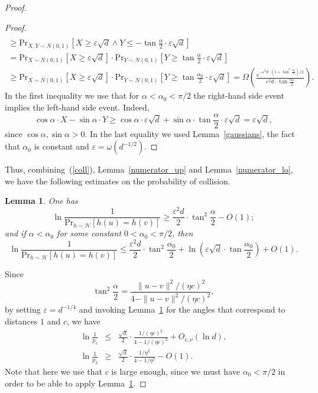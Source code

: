 \documentclass[11pt,letterpaper]{article}
\newtheorem{lemma}[theorem]{Lemma}
\newcommand{\eps}{\varepsilon}
\begin{document}
\begin{proof}
\begin{proof}
\begin{multline*}
            \\ \geq \mathrm{Pr}_{X, Y \sim N(0, 1)}[X \geq \eps \sqrt{d} \wedge Y \leq - \tan \frac{\alpha}{2} \cdot \eps \sqrt{d}] \\ =
            \mathrm{Pr}_{X \sim N(0, 1)}[X \geq \eps \sqrt{d}]
            \cdot \mathrm{Pr}_{Y \sim N(0, 1)}[Y \geq \tan \frac{\alpha}{2} \cdot
            \eps \sqrt{d}] \\ \geq
            \mathrm{Pr}_{X \sim N(0, 1)}[X \geq \eps \sqrt{d}]
            \cdot \mathrm{Pr}_{Y \sim N(0, 1)}[Y \geq \tan \frac{\alpha_0}{2} \cdot
            \eps \sqrt{d}]
            = \Omega\left(\frac{e^{-\eps^2 d \cdot (1 + \tan^2 \frac{\alpha_0}{2}) / 2}}
                    {\eps^2 d \cdot \tan \frac{\alpha_0}{2}}\right).
        \end{multline*}
        In the first inequality we use that for $\alpha < \alpha_0 < \pi / 2$
        the right-hand side event implies the left-hand side event.
        Indeed, 
        $$
            \cos \alpha \cdot X - \sin \alpha \cdot Y \geq \cos \alpha \cdot \eps \sqrt{d} + \sin \alpha \cdot \tan \frac{\alpha}{2} \cdot \eps \sqrt{d} = \eps \sqrt{d},
        $$
        since $\cos \alpha, \sin \alpha > 0$.
        In the last equality we used Lemma~\ref{gaussians}, the fact
        that $\alpha_0$ is constant and $\eps = \omega(d^{-1/2})$. 
    \end{proof}

    Thus, combining~(\ref{coll}), Lemma~\ref{numerator_up} and Lemma~\ref{numerator_lo}, we have the following estimates on the probability of collision.
    \begin{lemma}
        \label{closed_coll}
        One has
        $$
            \ln \frac{1}{\mathrm{Pr}_{h \sim \mathcal{H}}[h(u) = h(v)]}
            \geq \frac{\eps^2 d}{2} \cdot \tan^2 \frac{\alpha}{2} - O(1);
        $$
        and if $\alpha < \alpha_0$ for some constant $0 < \alpha_0 < \pi / 2$, then
        $$
            \ln \frac{1}{\mathrm{Pr}_{h \sim \mathcal{H}}[h(u) = h(v)]}
            \leq \frac{\eps^2 d}{2} \cdot \tan^2 \frac{\alpha_0}{2}
            + \ln\left(\eps \sqrt{d} \cdot \tan \frac{\alpha_0}{2}\right) + O(1).
        $$
    \end{lemma}
    Since
    $$
        \tan^2 \frac{\alpha}{2} = \frac{\|u - v\|^2 / (\eta c)^2}{4 - \|u - v\|^2 / (\eta c)^2},
    $$
    by setting $\eps = d^{-1/4}$ and invoking Lemma~\ref{closed_coll} for the angles that correspond to distances $1$ and $c$, we have
    \begin{eqnarray*}
        \ln \frac{1}{p_1} & \leq & \frac{\sqrt{d}}{2} \cdot
        \frac{1 / (\eta c)^2}{4 - 1 / (\eta c)^2} + O_{c, \nu}(\ln d), \\
        \ln \frac{1}{p_2} & \geq & \frac{\sqrt{d}}{2} \cdot \frac{1 / \eta^2}
        {4 - 1 / \eta^2} - O(1).
    \end{eqnarray*}
    Note that here we use that $c$ is large enough, since we must have $\alpha_0 < \pi / 2$ in order to be able to
    apply Lemma~\ref{closed_coll}.


\end{proof}
\end{document}
